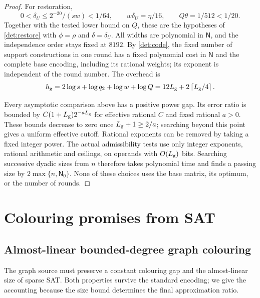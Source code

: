 \documentclass[11pt]{article} \usepackage[utf8]{inputenc}
\theoremstyle{plain} \newtheorem{theorem}{Theorem}[section]
\theoremstyle{definition} \newaliascnt{definition}{theorem}
\newcommand{\ceil}[1]{\left\lceil#1\right\rceil}
\begin{document}
\begin{proof}
For restoration,
\[
0<\delta_U\le2^{-20}/(sw)<1/64,\qquad
w\delta_U=\eta/16,\qquad Q\theta=1/512<1/20.
\]
Together with the tested lower bound on $Q$, these are the hypotheses of
\cref{det:restore} with $\phi=\rho$ and $\delta=\delta_U$.
All widths are polynomial in $\mathsf N$, and the independence order stays
fixed at $8192$. By \cref{det:code}, the fixed number of support constructions
in one round has a fixed polynomial cost in $\mathsf N$ and the complete
base encoding, including its rational weights; its exponent is independent
of the round number. The overhead is
\[
h_{\rm g}=2\log s+\log q_2+\log w+\log Q
=12L_{\rm g}+2\ceil{L_{\rm g}/4}.
\]

Every asymptotic comparison above has a positive power gap. Its error ratio
is bounded by $C(1+L_{\rm g})2^{-aL_{\rm g}}$ for effective rational $C$
and fixed rational $a>0$. These bounds decrease to zero once
$L_{\rm g}+1\ge2/a$; searching beyond this point gives a uniform effective
cutoff. Rational exponents can be removed by taking a fixed integer power.
The actual admissibility tests use only integer exponents, rational
arithmetic and ceilings, on operands with $O(L_{\rm g})$ bits.
Searching successive dyadic sizes from $n$ therefore takes polynomial time
and finds a passing size by $2\max\{n,\mathsf N_0\}$.
None of these choices uses the base matrix, its optimum, or the number of rounds.
\end{proof}

\section{Colouring promises from SAT}
\label{sec:sources}

\subsection{Almost-linear bounded-degree graph colouring}

The graph source must preserve a constant colouring gap and the almost-linear
size of sparse SAT. Both properties survive the standard encoding; we give the
accounting because the size bound determines the final approximation ratio.
\end{document}
